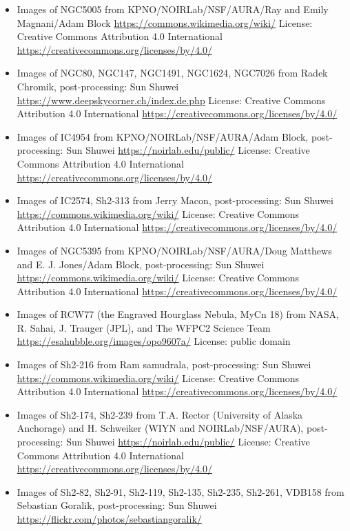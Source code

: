 \begin{itemize}
	 License: Creative Commons Attribution-Share Alike 4.0 International \url{https://creativecommons.org/licenses/by-sa/4.0/}
\item Images of NGC5005
	 from KPNO/NOIRLab/NSF/AURA/Ray and Emily Magnani/Adam Block
	 \url{https://commons.wikimedia.org/wiki/}
	 License: Creative Commons Attribution 4.0 International \url{https://creativecommons.org/licenses/by/4.0/}
\item Images of NGC80, NGC147, NGC1491, NGC1624, NGC7026
	 from Radek Chromik, post-processing: Sun Shuwei
	 \url{https://www.deepskycorner.ch/index.de.php}
	 License: Creative Commons Attribution 4.0 International \url{https://creativecommons.org/licenses/by/4.0/}
\item Images of IC4954
	 from KPNO/NOIRLab/NSF/AURA/Adam Block, post-processing: Sun Shuwei
	 \url{https://noirlab.edu/public/}
	 License: Creative Commons Attribution 4.0 International \url{https://creativecommons.org/licenses/by/4.0/}
\item Images of IC2574, Sh2-313
	 from Jerry Macon, post-processing: Sun Shuwei
	 \url{https://commons.wikimedia.org/wiki/}
	 License: Creative Commons Attribution 4.0 International \url{https://creativecommons.org/licenses/by/4.0/}
\item Images of NGC5395
	 from KPNO/NOIRLab/NSF/AURA/Doug Matthews and E. J. Jones/Adam Block, post-processing: Sun Shuwei
	 \url{https://commons.wikimedia.org/wiki/}
	 License: Creative Commons Attribution 4.0 International \url{https://creativecommons.org/licenses/by/4.0/}
\item Images of RCW77 (the Engraved Hourglass Nebula, MyCn 18)
	 from NASA, R. Sahai, J. Trauger (JPL), and The WFPC2 Science Team
	 \url{https://esahubble.org/images/opo9607a/}
	 License: public domain
\item Images of Sh2-216
	 from Ram samudrala, post-processing: Sun Shuwei
	 \url{https://commons.wikimedia.org/wiki/}
	 License: Creative Commons Attribution 4.0 International \url{https://creativecommons.org/licenses/by/4.0/}
\item Images of Sh2-174, Sh2-239
	 from T.A. Rector (University of Alaska Anchorage) and H. Schweiker (WIYN and NOIRLab/NSF/AURA), post-processing: Sun Shuwei
	 \url{https://noirlab.edu/public/}
	 License: Creative Commons Attribution 4.0 International \url{https://creativecommons.org/licenses/by/4.0/}
\item Images of Sh2-82, Sh2-91, Sh2-119, Sh2-135, Sh2-235, Sh2-261, VDB158
	 from Sebastian Goralik, post-processing: Sun Shuwei
	 \url{https://flickr.com/photos/sebastiangoralik/}

\end{itemize}
